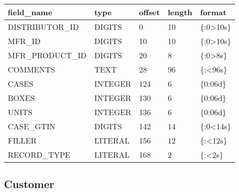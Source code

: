 \documentclass[letterpaper,10pt,english]{sphinxmanual}
\begin{document}
\begin{savenotes}\sphinxattablestart
\centering
\begin{tabulary}{\linewidth}[t]{|T|T|T|T|T|}
\hline
\sphinxstyletheadfamily 
field\_name
&\sphinxstyletheadfamily 
type
&\sphinxstyletheadfamily 
offset
&\sphinxstyletheadfamily 
length
&\sphinxstyletheadfamily 
format
\\
\hline
DISTRIBUTOR\_ID
&
DIGITS
&
0
&
10
&
\{:0\textgreater{}10s\}
\\
\hline
MFR\_ID
&
DIGITS
&
10
&
10
&
\{:0\textgreater{}10s\}
\\
\hline
MFR\_PRODUCT\_ID
&
DIGITS
&
20
&
8
&
\{:0\textgreater{}8s\}
\\
\hline
COMMENTS
&
TEXT
&
28
&
96
&
\{:\textless{}96s\}
\\
\hline
CASES
&
INTEGER
&
124
&
6
&
\{0:06d\}
\\
\hline
BOXES
&
INTEGER
&
130
&
6
&
\{0:06d\}
\\
\hline
UNITS
&
INTEGER
&
136
&
6
&
\{0:06d\}
\\
\hline
CASE\_GTIN
&
DIGITS
&
142
&
14
&
\{:0\textless{}14s\}
\\
\hline
FILLER
&
LITERAL
&
156
&
12
&
\{:\textless{}12s\}
\\
\hline
RECORD\_TYPE
&
LITERAL
&
168
&
2
&
\{:\textless{}2s\}
\\
\hline
\end{tabulary}
\par
\sphinxattableend\end{savenotes}


\subsection{Customer}
\label{\detokenize{cds_record_layout:customer}}
\end{document}
